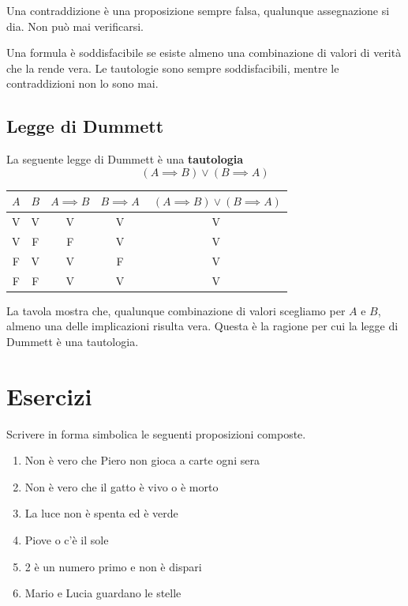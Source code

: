 Una contraddizione è una proposizione sempre falsa, qualunque assegnazione si dia. Non può mai verificarsi.

Una formula è soddisfacibile se esiste almeno una combinazione di valori di verità che la rende vera. Le tautologie sono sempre soddisfacibili, mentre le contraddizioni non lo sono mai.

\subsection{Legge di Dummett}

La seguente legge di Dummett è una \textbf{tautologia}
\[
    (A \implies B) \lor (B \implies A)
\]


\begin{center}
\begin{tabular}{c|c|c|c|c}
  \(A\) & \(B\) & \( A \implies B\) & \(B \implies A\) & \(\ (A \implies B) \lor (B\implies A)\) \\
  \hline
  V & V & V & V & V \\
  V & F & F & V & V \\
  F & V & V & F & V \\
  F & F & V & V & V \\
\end{tabular}
\end{center}

La tavola mostra che, qualunque combinazione di valori scegliamo per \(A\) e \(B\), almeno una delle implicazioni risulta vera. Questa è la ragione per cui la legge di Dummett è una tautologia.


\newpage
\section{Esercizi}
\begin{esercizio}
Scrivere in forma simbolica le seguenti proposizioni composte. 
\begin{enumerate}
    \item Non è vero che Piero non gioca a carte ogni sera
    \item Non è vero che il gatto è vivo o è morto
    \item La luce non è spenta ed è verde
    \item Piove o c’è il sole
    \item 2 è un numero primo e non è dispari
    \item Mario e Lucia guardano le stelle
\end{enumerate}
\end{esercizio}

